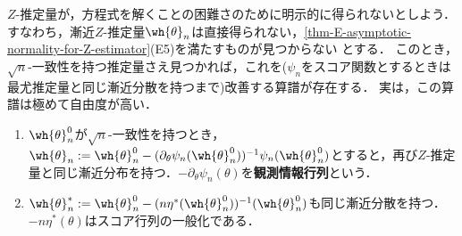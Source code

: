 \documentclass[uplatex,dvipdfmx]{jsreport}
\begin{document}
\begin{tcolorbox}[colframe=ForestGreen, colback=ForestGreen!10!white,breakable,colbacktitle=ForestGreen!40!white,coltitle=black,fonttitle=\bfseries\sffamily,
title=]
    $Z$-推定量が，方程式を解くことの困難さのために明示的に得られないとしよう．
    すなわち，漸近$Z$-推定量$\wh{\theta}_n$は直接得られない，\ref{thm-E-asymptotic-normality-for-Z-estimator}(E5)を満たすものが見つからない
    とする．
    このとき，$\sqrt{n}$-一致性を持つ推定量さえ見つかれば，これを($\psi_n$をスコア関数とするときは最尤推定量と同じ漸近分散を持つまで)改善する算譜が存在する．
    実は，この算譜は極めて自由度が高い．
    \begin{enumerate}
        \item $\wh{\theta}^0_n$が$\sqrt{n}$-一致性を持つとき，$\wh{\theta}_n:=\wh{\theta}^0_n-(\partial_\theta\psi_n(\wh{\theta}^0_n))^{-1}\psi_n(\wh{\theta}^0_n)$とすると，再び$Z$-推定量と同じ漸近分布を持つ．$-\partial_\theta\psi_n(\theta)$を\textbf{観測情報行列}という．
        \item $\wh{\theta}^*_n:=\wh{\theta}^0_n-(n\eta^*(\wh{\theta}^0_n))^{-1}(\wh{\theta}^0_n)$も同じ漸近分散を持つ．$-n\eta^*(\theta)$はスコア行列の一般化である．
    \end{enumerate}
\end{tcolorbox}
\end{document}

